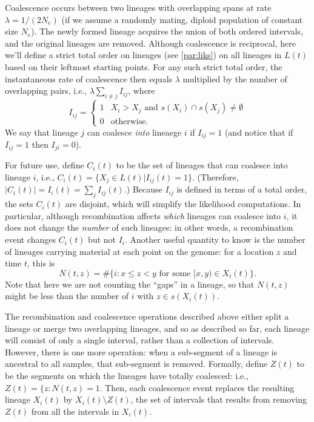\documentclass{article}
\begin{document}
Coalescence occurs between
two lineages with overlapping spans at rate $\lambda = 1/(2N_e)$
(if we assume a randomly mating, diploid population of constant size $N_e$).
The newly formed lineage acquires the union of both ordered intervals, %
and the original lineages are removed.
Although coalescence is reciprocal, here we'll define a strict total order on lineages
(see \ref{par:liks}) on all lineages in $L(t)$ based on their leftmost starting points.
For any such strict total order,
the instantaneous rate of coalescence then equals $\lambda$ multiplied by the number of overlapping pairs,
i.e., $\lambda \sum_{i \neq j} I_{ij}$,
where
\begin{equation} \label{def:coal}
I_{ij} = \begin{cases}
    1 & X_i > X_j \text{ and } s(X_i) \cap s(X_j) \neq \emptyset \\
    0 & \text{otherwise.}
\end{cases}
\end{equation}
We say that lineage $j$ can coalesce \emph{into} lineaege $i$ if $I_{ij} = 1$
(and notice that if $I_{ij} = 1$ then $I_{ji} = 0$).

For future use, define $C_i(t)$ to be the set of lineages that can coalesce into lineage $i$,
i.e., $C_i(t) = \{X_j \in L(t) | I_{ij}(t) = 1\}$.
(Therefore, $|C_i(t)| = I_{i}(t) = \sum_{j} I_{ij}(t)$.)
Because $I_{ij}$ is defined in terms of a total order, the sets $C_i(t)$ are disjoint,
which will simplify the likelihood computations.
In particular,
although recombination affects \emph{which} lineages can coalesce into $i$,
it does not change the \emph{number} of such lineages:
in other words, a recombination event changes $C_i(t)$ but not $I_{i}$.
Another useful quantity to know is the number of lineages carrying material
at each point on the genome:
for a location $z$ and time $t$, this is
\begin{equation}
    N(t,z) = \#\{i : x \le z < y \text{ for some } [x,y) \in X_i(t) \} .
\end{equation}
Note that here we are not counting the ``gaps'' in a lineage,
so that $N(t, z)$ might be less than the number of $i$ with $z \in s(X_i(t))$.

The recombination and coalescence operations described above
either split a lineage or merge two overlapping lineages,
and so as described so far, each lineage will consist of only a single interval,
rather than a collection of intervals.
However, there is one more operation:
when a sub-segment of a lineage is ancestral to all samples,
that sub-segment is removed.
Formally, define $Z(t)$ to be the segments on which the lineages have totally coalesced:
i.e., $Z(t) = \{z : N(t,z) = 1$.
Then, each coalescence event replaces the resulting lineage $X_i(t)$
by $X_i(t) \setminus Z(t)$,
the set of intervals that results from removing $Z(t)$ from all the intervals in $X_i(t)$.
\end{document}
